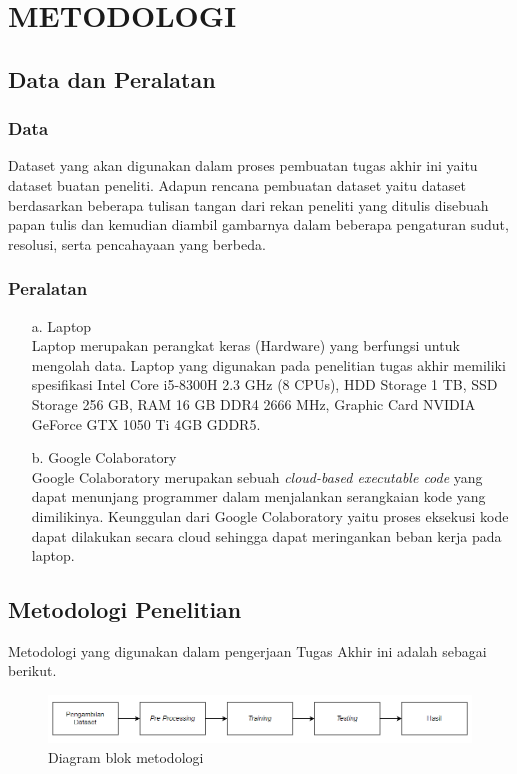 \section{METODOLOGI}


\subsection{Data dan Peralatan}

\subsubsection{Data}
Dataset yang akan digunakan dalam proses pembuatan tugas akhir ini yaitu dataset buatan peneliti. Adapun rencana pembuatan dataset yaitu dataset berdasarkan beberapa tulisan tangan dari rekan peneliti yang ditulis disebuah papan tulis dan kemudian diambil gambarnya dalam beberapa pengaturan sudut, resolusi, serta pencahayaan yang berbeda.

\subsubsection{Peralatan}
\begin{itemize}
   \item [a.] Laptop \\
   Laptop merupakan perangkat keras (Hardware) yang berfungsi untuk mengolah data. Laptop yang digunakan pada penelitian tugas akhir memiliki spesifikasi Intel Core i5-8300H 2.3 GHz (8 CPUs), HDD Storage 1 TB, SSD Storage 256 GB, RAM 16 GB DDR4 2666 MHz, Graphic Card NVIDIA GeForce GTX 1050 Ti 4GB GDDR5.

   \item [b.] Google Colaboratory \\
   Google Colaboratory merupakan sebuah \textit{cloud-based executable code} yang dapat menunjang programmer dalam menjalankan serangkaian kode yang dimilikinya. Keunggulan dari Google Colaboratory yaitu proses eksekusi kode dapat dilakukan secara cloud sehingga dapat meringankan beban kerja pada laptop.
\end{itemize}
   

\subsection{Metodologi Penelitian}
Metodologi yang digunakan dalam pengerjaan Tugas Akhir ini adalah sebagai berikut.
    \begin{figure} [H] \centering
      \includegraphics[scale=0.6]{gambar/Metodologi.png}
      \caption{Diagram blok metodologi}
      \label{fig:Metodologi}
    \end{figure}

